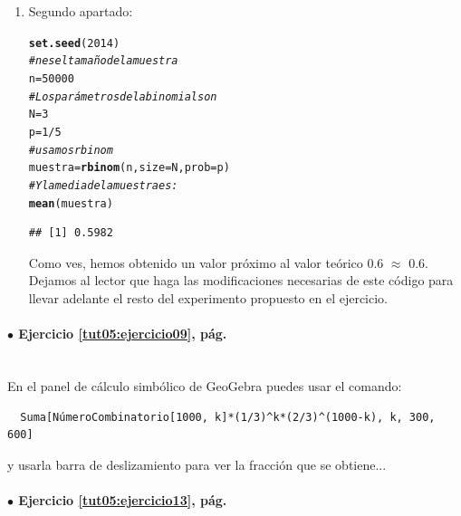 \documentclass[10pt,a4paper]{article}\usepackage[]{graphicx}\usepackage[]{color}
\makeatletter
\newcommand{\hlnum}[1]{\textcolor[rgb]{0.686,0.059,0.569}{#1}}%
\newcommand{\hlcom}[1]{\textcolor[rgb]{0.678,0.584,0.686}{\textit{#1}}}%
\newcommand{\hlopt}[1]{\textcolor[rgb]{0,0,0}{#1}}%
\newcommand{\hlstd}[1]{\textcolor[rgb]{0.345,0.345,0.345}{#1}}%
\newcommand{\hlkwb}[1]{\textcolor[rgb]{0.69,0.353,0.396}{#1}}%
\newcommand{\hlkwc}[1]{\textcolor[rgb]{0.333,0.667,0.333}{#1}}%
\newcommand{\hlkwd}[1]{\textcolor[rgb]{0.737,0.353,0.396}{\textbf{#1}}}%
\newenvironment{kframe}{%
 \def\at@end@of@kframe{}%
 \ifinner\ifhmode%
  \def\at@end@of@kframe{\end{minipage}}%
  \begin{minipage}{\columnwidth}%
 \fi\fi%
 \def\FrameCommand##1{\hskip\@totalleftmargin \hskip-\fboxsep
 \colorbox{shadecolor}{##1}\hskip-\fboxsep
     \hskip-\linewidth \hskip-\@totalleftmargin \hskip\columnwidth}%
 \MakeFramed {\advance\hsize-\width
   \@totalleftmargin\z@ \linewidth\hsize
   \@setminipage}}%
 {\par\unskip\endMakeFramed%
 \at@end@of@kframe}
\newenvironment{knitrout}{}{} %
\makeatother
\begin{document}
\begin{enumerate}
  \item Segundo apartado:
\begin{knitrout}
\color{fgcolor}\begin{kframe}
\begin{alltt}
\hlkwd{set.seed}\hlstd{(}\hlnum{2014}\hlstd{)}
\hlcom{# n es el tamaño de la muestra}
\hlstd{n} \hlkwb{=} \hlnum{50000}
\hlcom{# Los parámetros de la binomial son}
\hlstd{N} \hlkwb{=} \hlnum{3}
\hlstd{p} \hlkwb{=} \hlnum{1}\hlopt{/}\hlnum{5}
\hlcom{# usamos rbinom}
\hlstd{muestra} \hlkwb{=} \hlkwd{rbinom}\hlstd{(n,} \hlkwc{size}\hlstd{=N,} \hlkwc{prob} \hlstd{= p)}
\hlcom{#Y la media de la muestra es:}
\hlkwd{mean}\hlstd{(muestra)}
\end{alltt}
\begin{verbatim}
## [1] 0.5982
\end{verbatim}
\end{kframe}
\end{knitrout}
        Como ves, hemos obtenido un valor próximo al valor teórico 0.6 $\approx$ 0.6. Dejamos al lector que haga las modificaciones necesarias de este código para llevar adelante el resto del experimento propuesto en el ejercicio.

\end{enumerate}

\paragraph{\bf $\bullet$ Ejercicio \ref{tut05:ejercicio09}, pág. \pageref{tut05:ejercicio09}}
\label{tut05:ejercicio09:sol}\quad\\

En el panel de cálculo simbólico de GeoGebra puedes usar el comando:
\begin{verbatim}
  Suma[NúmeroCombinatorio[1000, k]*(1/3)^k*(2/3)^(1000-k), k, 300, 600]
\end{verbatim}
y usarla barra de deslizamiento para ver la fracción que se obtiene...




\paragraph{\bf $\bullet$ Ejercicio \ref{tut05:ejercicio13}, pág. \pageref{tut05:ejercicio13}}
\label{tut05:ejercicio13:sol}\quad\\
\end{document}

